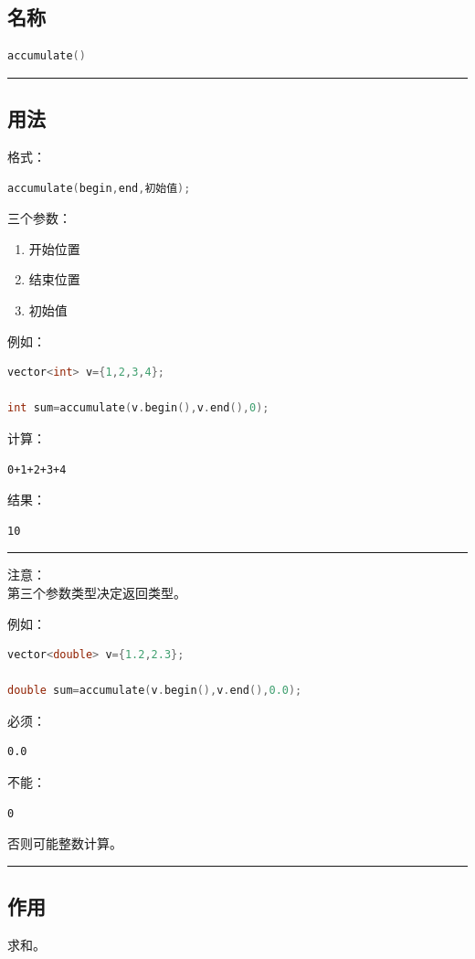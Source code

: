 \documentclass[9pt,twocolumn]{extarticle}
\begin{document}
\subsection{名称}
\begin{lstlisting}[language=C++]
accumulate()
\end{lstlisting}

\noindent\rule{\linewidth}{0.4pt}

\subsection{用法}
格式：
\begin{lstlisting}[language=C++]
accumulate(begin,end,初始值);
\end{lstlisting}
三个参数：
\begin{enumerate}
    \item 开始位置
    \item 结束位置
    \item 初始值
\end{enumerate}

例如：
\begin{lstlisting}[language=C++]
vector<int> v={1,2,3,4};

int sum=accumulate(v.begin(),v.end(),0);
\end{lstlisting}
计算：
\begin{lstlisting}
0+1+2+3+4
\end{lstlisting}
结果：
\begin{lstlisting}
10
\end{lstlisting}

\noindent\rule{\linewidth}{0.4pt}

注意：\\
第三个参数类型决定返回类型。

例如：
\begin{lstlisting}[language=C++]
vector<double> v={1.2,2.3};

double sum=accumulate(v.begin(),v.end(),0.0);
\end{lstlisting}
必须：
\begin{lstlisting}
0.0
\end{lstlisting}
不能：
\begin{lstlisting}
0
\end{lstlisting}
否则可能整数计算。

\noindent\rule{\linewidth}{0.4pt}

\subsection{作用}
求和。
\end{document}
